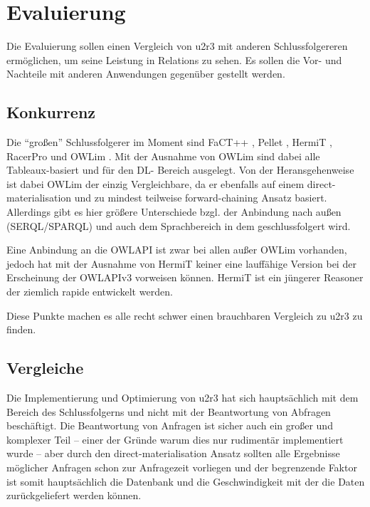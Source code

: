 \chapter{Evaluierung}
Die Evaluierung sollen einen Vergleich von u2r3 mit anderen Schlussfolgereren ermöglichen, um seine Leistung in Relations zu sehen. Es sollen die Vor- und Nachteile mit anderen Anwendungen gegenüber gestellt werden.

\section{Konkurrenz}
Die ``großen'' Schlussfolgerer im Moment sind FaCT++ \cite{Factpp}, Pellet \cite{Pellet}, HermiT \cite{HermiT}, RacerPro \cite{RacerPro} und OWLim \cite{OWLim}. Mit der Ausnahme von OWLim sind dabei alle Tableaux-basiert und für den DL- Bereich ausgelegt. Von der Heransgehenweise ist dabei OWLim der einzig Vergleichbare, da er ebenfalls auf einem direct-materialisation und zu mindest teilweise forward-chaining Ansatz basiert. Allerdings gibt es hier größere Unterschiede bzgl. der Anbindung nach außen (\mbox{SERQL}/\mbox{SPARQL}) und auch dem Sprachbereich in dem geschlussfolgert wird.

Eine Anbindung an die OWLAPI ist zwar bei allen außer OWLim vorhanden, jedoch hat mit der Ausnahme von HermiT keiner eine lauffähige Version bei der Erscheinung der OWLAPIv3 vorweisen können. HermiT ist ein jüngerer Reasoner der ziemlich rapide entwickelt werden.

Diese Punkte machen es alle recht schwer einen brauchbaren Vergleich zu u2r3 zu finden.

\section{Vergleiche}
\label{abschnitt-vergleiche}
Die Implementierung und Optimierung von u2r3 hat sich hauptsächlich mit dem Bereich des Schlussfolgerns und nicht mit der Beantwortung von Abfragen beschäftigt. Die Beantwortung von Anfragen ist sicher auch ein großer und komplexer Teil -- einer der Gründe warum dies nur rudimentär implementiert wurde -- aber durch den direct-materialisation Ansatz sollten alle Ergebnisse möglicher Anfragen schon zur Anfragezeit vorliegen und der begrenzende Faktor ist somit hauptsächlich die Datenbank und die Geschwindigkeit mit der die Daten zurückgeliefert werden können.


